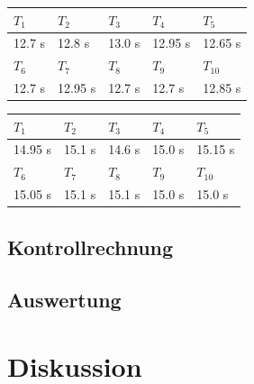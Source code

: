 \documentclass[12pt,a4paper]{article}
\begin{document}
\begin{tabular}{|l|l|l|l|l|}
\hline
$T_{1}$&$T_{2}$&$T_{3}$&$T_{4}$&$T_{5}$\\
\hline
12.7 s&12.8 s&13.0 s&12.95 s&12.65 s\\
\hline
\hline
$T_{6}$&$T_{7}$&$T_{8}$&$T_{9}$&$T_{10}$\\
\hline
12.7 s&12.95 s&12.7 s&12.7 s&12.85 s\\
\hline
\end{tabular}

\begin{tabular}{|l|l|l|l|l|}
\hline
$T_{1}$&$T_{2}$&$T_{3}$&$T_{4}$&$T_{5}$\\
\hline
14.95 s&15.1 s&14.6 s&15.0 s&15.15 s\\
\hline
\hline
$T_{6}$&$T_{7}$&$T_{8}$&$T_{9}$&$T_{10}$\\
\hline
15.05 s&15.1 s&15.1 s&15.0 s&15.0 s\\
\hline
\end{tabular}

\subsection*{Kontrollrechnung}

\subsection*{Auswertung}

\section*{Diskussion}
\end{document}
